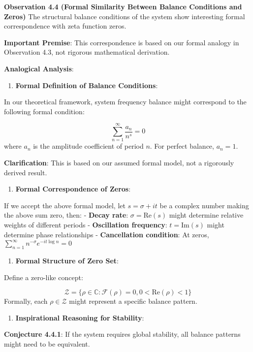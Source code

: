 \textbf{Observation 4.4 (Formal Similarity Between Balance Conditions and Zeros)}
\label{obs:4.4}
The structural balance conditions of the system show interesting formal correspondence with zeta function zeros.

\textbf{Important Premise}: This correspondence is based on our formal analogy in Observation 4.3, not rigorous mathematical derivation.

\textbf{Analogical Analysis}:

\begin{enumerate}
\item \textbf{Formal Definition of Balance Conditions}:
\end{enumerate}
   In our theoretical framework, system frequency balance might correspond to the following formal condition:
   
\begin{equation}
\sum_{n=1}^{\infty} \frac{a_n}{n^s} = 0
\end{equation}
   where $a_n$ is the amplitude coefficient of period $n$. For perfect balance, $a_n = 1$.
   
   \textbf{Clarification}: This is based on our assumed formal model, not a rigorously derived result.
   
\begin{enumerate}
\item \textbf{Formal Correspondence of Zeros}:
\end{enumerate}
   If we accept the above formal model, let $s = \sigma + it$ be a complex number making the above sum zero, then:
   - \textbf{Decay rate}: $\sigma = \text{Re}(s)$ might determine relative weights of different periods
   - \textbf{Oscillation frequency}: $t = \text{Im}(s)$ might determine phase relationships
   - \textbf{Cancellation condition}: At zeros, $\sum_{n=1}^{\infty} n^{-\sigma}e^{-it\log n} = 0$
   
\begin{enumerate}
\item \textbf{Formal Structure of Zero Set}:
\end{enumerate}
   Define a zero-like concept:
   
\begin{equation}
\mathcal{Z} = \{\rho \in \mathbb{C}: \mathcal{F}(\rho) = 0, 0 < \text{Re}(\rho) < 1\}
\end{equation}
   Formally, each $\rho \in \mathcal{Z}$ might represent a specific balance pattern.
   
\begin{enumerate}
\item \textbf{Inspirational Reasoning for Stability}:
\end{enumerate}
   \textbf{Conjecture 4.4.1}: If the system requires global stability, all balance patterns might need to be equivalent.
   
